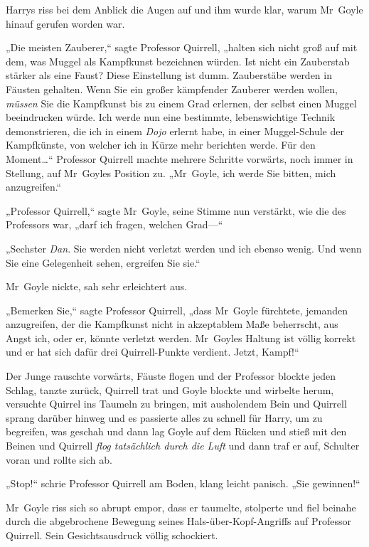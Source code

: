 {Harrys riss bei dem Anblick die Augen auf und ihm wurde klar, warum Mr~Goyle hinauf gerufen worden war.

„Die meisten Zauberer,“ sagte Professor Quirrell, „halten sich nicht groß auf mit dem, was Muggel als Kampfkunst bezeichnen würden. Ist nicht ein Zauberstab stärker als eine Faust? Diese Einstellung ist dumm. Zauberstäbe werden in Fäusten gehalten. Wenn Sie ein großer kämpfender Zauberer werden wollen, \emph{müssen} Sie die Kampfkunst bis zu einem Grad erlernen, der selbst einen Muggel beeindrucken würde. Ich werde nun eine bestimmte, lebenswichtige Technik demonstrieren, die ich in einem \emph{Dojo} erlernt habe, in einer Muggel-Schule der Kampfkünste, von welcher ich in Kürze mehr berichten werde. Für den Moment…“ Professor Quirrell machte mehrere Schritte vorwärts, noch immer in Stellung, auf Mr~Goyles Position zu. „Mr~Goyle, ich werde Sie bitten, mich anzugreifen.“

„Professor Quirrell,“ sagte Mr~Goyle, seine Stimme nun verstärkt, wie die des Professors war, „darf ich fragen, welchen Grad—“

„Sechster \emph{Dan}. Sie werden nicht verletzt werden und ich ebenso wenig. Und wenn Sie eine Gelegenheit sehen, ergreifen Sie sie.“

Mr~Goyle nickte, sah sehr erleichtert aus.

„Bemerken Sie,“ sagte Professor Quirrell, „dass Mr~Goyle fürchtete, jemanden anzugreifen, der die Kampfkunst nicht in akzeptablem Maße beherrscht, aus Angst ich, oder er, könnte verletzt werden. Mr~Goyles Haltung ist völlig korrekt und er hat sich dafür drei Quirrell-Punkte verdient. Jetzt, Kampf!“

Der Junge rauschte vorwärts, Fäuste flogen und der Professor blockte jeden Schlag, tanzte zurück, Quirrell trat und Goyle blockte und wirbelte herum, versuchte Quirrel ins Taumeln zu bringen, mit ausholendem Bein und Quirrell sprang darüber hinweg und es passierte alles zu schnell für Harry, um zu begreifen, was geschah und dann lag Goyle auf dem Rücken und stieß mit den Beinen und Quirrell \emph{flog tatsächlich durch die Luft} und dann traf er auf, Schulter voran und rollte sich ab.

„Stop!“ schrie Professor Quirrell am Boden, klang leicht panisch. „Sie gewinnen!“

Mr~Goyle riss sich so abrupt empor, dass er taumelte, stolperte und fiel beinahe durch die abgebrochene Bewegung seines Hals-über-Kopf-Angriffs auf Professor Quirrell. Sein Gesichtsausdruck völlig schockiert.

}
